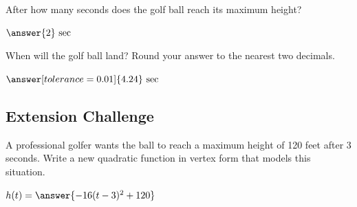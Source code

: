 \documentclass{ximera}
\begin{document}
\begin{problem}
After how many seconds does the golf ball reach its maximum height? 

$\answer{2} \mbox{ sec}$
\end{problem}


\begin{problem}
When will the golf ball land? Round your answer to the nearest two decimals. 

$\answer[tolerance=0.01]{4.24 } \mbox{ sec}$
\end{problem}




\subsection*{Extension Challenge}
\begin{problem}
A professional golfer wants the ball to reach a maximum height of 120 feet after 3 seconds. Write a new quadratic function in vertex form that models this situation. 

$h(t)=\answer{-16(t-3)^2+120}$
\end{problem}
\end{document}
